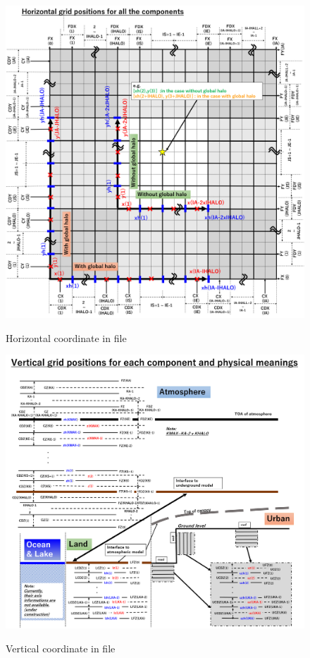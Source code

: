 \begin{figure}[tbh]
\begin{center}
  \includegraphics[width=1.0\hsize]{./figure/horizontal-coordinate-final2.png}\\
  \caption{Horizontal coordinate in {\scalenetcdf} file}
  \label{fig:netcdfhorizontalcoordinate}
\end{center}
\end{figure}
\begin{figure}[tbh]
\begin{center}
  \includegraphics[width=1.0\hsize]{./figure/vertical_coordinate_final2.png}\\
  \caption{Vertical coordinate in {\scalenetcdf} file}
  \label{fig:netcdfverticalcoordinate}
\end{center}
\end{figure}




